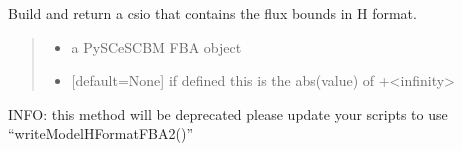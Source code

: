 \documentclass[letterpaper,12pt,english]{sphinxmanual}
\begin{document}
\begin{fulllineitems}

\pysigstartsignatures
\pysiglinewithargsret
{}
{\sphinxparamcomma {}\sphinxparamcomma {}}
{}
\pysigstopsignatures
\sphinxAtStartPar
Build and return a csio that contains the flux bounds in H format.
\begin{quote}\begin{description}
\begin{itemize}
\item {} 
\sphinxAtStartPar
{} \textendash{} a PySCeS\sphinxhyphen{}CBM FBA object

\item {} 
\sphinxAtStartPar
{} \textendash{} {[}default=None{]} if defined this is the abs(value) of +\sphinxhyphen{}\textless{}infinity\textgreater{}

\end{itemize}

\end{description}\end{quote}

\end{fulllineitems}



\begin{fulllineitems}

\pysigstartsignatures
\pysiglinewithargsret
{}
{\sphinxparamcomma {}\sphinxparamcomma {}\sphinxparamcomma {}\sphinxparamcomma {}\sphinxparamcomma {}}
{}
\pysigstopsignatures
\sphinxAtStartPar
INFO: this method will be deprecated please update your scripts to use “writeModelHFormatFBA2()”

\end{fulllineitems}
\end{document}
